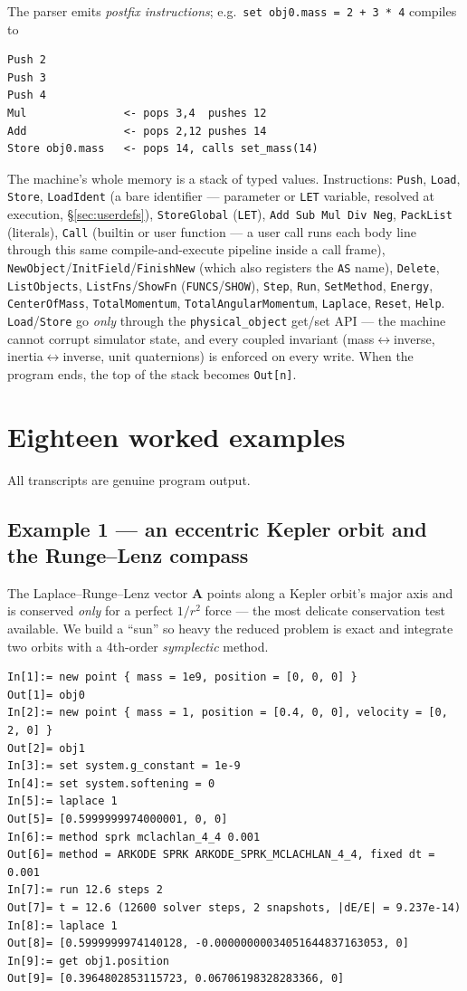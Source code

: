 \documentclass[11pt]{article}
\newcommand{\kw}[1]{\texttt{\uppercase{#1}}}
\newcommand{\code}[1]{\texttt{#1}}
\begin{document}
The parser emits \emph{postfix instructions}; e.g.\
\code{set obj0.mass = 2 + 3 * 4} compiles to
\begin{lstlisting}
Push 2
Push 3
Push 4
Mul               <- pops 3,4  pushes 12
Add               <- pops 2,12 pushes 14
Store obj0.mass   <- pops 14, calls set_mass(14)
\end{lstlisting}
The machine's whole memory is a stack of typed values. Instructions:
\code{Push}, \code{Load}, \code{Store}, \code{LoadIdent} (a bare
identifier --- parameter or \kw{let} variable, resolved at execution,
\S\ref{sec:userdefs}), \code{StoreGlobal} (\kw{let}),
\code{Add Sub Mul Div Neg},
\code{PackList} (literals), \code{Call} (builtin or user function ---
a user call runs each body line through this same compile-and-execute
pipeline inside a call frame),
\code{NewObject}/\code{InitField}/\code{FinishNew} (which also
registers the \kw{as} name), \code{Delete},
\code{ListObjects}, \code{ListFns}/\code{ShowFn}
(\kw{funcs}/\kw{show}), \code{Step}, \code{Run}, \code{SetMethod},
\code{Energy}, \code{CenterOfMass}, \code{TotalMomentum},
\code{TotalAngularMomentum}, \code{Laplace}, \code{Reset}, \code{Help}.
\code{Load}/\code{Store} go \emph{only} through the
\code{physical\_object} get/set API --- the machine cannot corrupt
simulator state, and every coupled invariant (mass$\leftrightarrow$inverse,
inertia$\leftrightarrow$inverse, unit quaternions) is enforced on every
write. When the program ends, the top of the stack becomes \code{Out[n]}.

\section{Eighteen worked examples}

All transcripts are genuine program output.

\subsection{Example 1 --- an eccentric Kepler orbit and the Runge--Lenz compass}

The Laplace--Runge--Lenz vector $\mathbf A$ points along a Kepler
orbit's major axis and is conserved \emph{only} for a perfect $1/r^2$
force --- the most delicate conservation test available. We build a
``sun'' so heavy the reduced problem is exact and integrate two orbits
with a 4th-order \emph{symplectic} method.

\begin{lstlisting}
In[1]:= new point { mass = 1e9, position = [0, 0, 0] }
Out[1]= obj0
In[2]:= new point { mass = 1, position = [0.4, 0, 0], velocity = [0, 2, 0] }
Out[2]= obj1
In[3]:= set system.g_constant = 1e-9
In[4]:= set system.softening = 0
In[5]:= laplace 1
Out[5]= [0.5999999974000001, 0, 0]
In[6]:= method sprk mclachlan_4_4 0.001
Out[6]= method = ARKODE SPRK ARKODE_SPRK_MCLACHLAN_4_4, fixed dt = 0.001
In[7]:= run 12.6 steps 2
Out[7]= t = 12.6 (12600 solver steps, 2 snapshots, |dE/E| = 9.237e-14)
In[8]:= laplace 1
Out[8]= [0.5999999974140128, -0.00000000034051644837163053, 0]
In[9]:= get obj1.position
Out[9]= [0.3964802853115723, 0.06706198328283366, 0]
\end{lstlisting}
\end{document}
